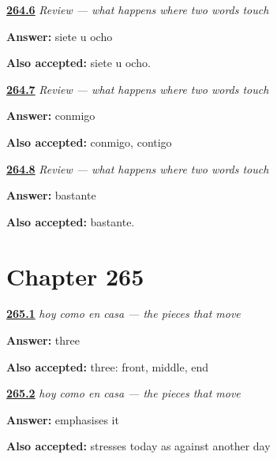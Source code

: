 \noindent\begin{minipage}[t]{\linewidth}
\raggedright
\hyperlink{review-ES-C67-repaso-cuando-dos-palabras-se-tocan-u}{\textbf{264.6}} \emph{Review — what happens where two words touch}\par
\small \textbf{Answer:} siete u ocho\par
\footnotesize \textbf{Also accepted:} siete u ocho.
\end{minipage}\par\medskip

\noindent\begin{minipage}[t]{\linewidth}
\raggedright
\hyperlink{review-ES-C67-repaso-cuando-dos-palabras-se-tocan-conmigo}{\textbf{264.7}} \emph{Review — what happens where two words touch}\par
\small \textbf{Answer:} conmigo\par
\footnotesize \textbf{Also accepted:} conmigo, contigo
\end{minipage}\par\medskip

\noindent\begin{minipage}[t]{\linewidth}
\raggedright
\hyperlink{review-ES-C67-repaso-cuando-dos-palabras-se-tocan-grado}{\textbf{264.8}} \emph{Review — what happens where two words touch}\par
\small \textbf{Answer:} bastante\par
\footnotesize \textbf{Also accepted:} bastante.
\end{minipage}\par\medskip

\section*{Chapter 265}

\noindent\begin{minipage}[t]{\linewidth}
\raggedright
\hyperlink{review-ES-C67-hoy-como-en-casa-three}{\textbf{265.1}} \emph{hoy como en casa — the pieces that move}\par
\small \textbf{Answer:} three\par
\footnotesize \textbf{Also accepted:} three: front, middle, end
\end{minipage}\par\medskip

\noindent\begin{minipage}[t]{\linewidth}
\raggedright
\hyperlink{review-ES-C67-hoy-como-en-casa-front}{\textbf{265.2}} \emph{hoy como en casa — the pieces that move}\par
\small \textbf{Answer:} emphasises it\par
\footnotesize \textbf{Also accepted:} stresses today as against another day
\end{minipage}\par\medskip

